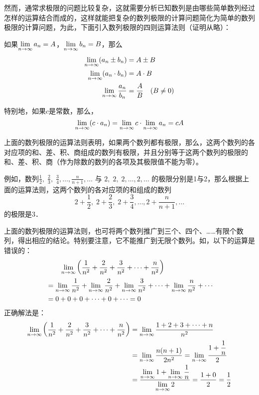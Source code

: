 然而，通常求极限的问题比较复杂，这就需要分析已知数列是由哪些简单数列经过怎样的运算结合而成的，这样就能把复杂的数列极限的计算问题简化为简单的数列极限的计算问题，为此，下面引入数列极限的四则运算法则（证明从略）：

\begin{thm}{}
如果$\lim\limits_{n\to \infty} a_n=A$，$\lim\limits_{n\to \infty} b_n=B$，那么
\[\begin{split}
    \lim\limits_{n\to \infty} (a_n\pm b_n)&=A\pm B\\
    \lim\limits_{n\to \infty} (a_n\cdot b_n)&=A\cdot B\\
    \lim\limits_{n\to \infty} \dfrac{a_n}{b_n}&=\dfrac{A}{B}\quad (B\ne 0)
\end{split}\]
\end{thm}

特别地，如果$c$是常数，那么，
\[\lim\limits_{n\to \infty}(c\cdot a_n)=\lim\limits_{n\to \infty} c\cdot \lim\limits_{n\to \infty}a_n=cA\]

上面的数列极限的运算法则表明，如果两个数列都有极限，那么，这两个数列的各对应项的和、差、积、商组成的数列有极限，并且分别等于这两个数列的极限的和、差、积、商（作为除数的数列的各项及其极限值不能为零）。

例如，数列$\frac{1}{2},\; \frac{2}{3},\; \frac{3}{4},\ldots, \frac{n}{n+1},\ldots$
与
$2,\;2,\;2,\ldots,2,\ldots$
的极限分别是1与2，那么根据上面的运算法则，这两个数列的各对应项的和组成的数列
$$2+\frac{1}{2},\; 2+\frac{2}{3},\; 2+\frac{3}{4},\ldots,2+\frac{n}{n+1},\ldots$$的极限是3．

上面的数列极限的运算法则，也可将两个数列推广到三个、四个、……有限个数列，得出相应的结论。特别要注意，它不能推广到无限个数列。如，以下的运算是错误的：
\[\begin{split}
   &\qquad  \lim\limits_{n\to \infty} \left(\dfrac{1}{n^2}+\dfrac{2}{n^2}+\dfrac{3}{n^2}+\cdots+\dfrac{n}{n^2}\right)\\
&=\lim\limits_{n\to \infty} \dfrac{1}{n^2}+\lim\limits_{n\to \infty} \dfrac{2}{n^2}+\lim\limits_{n\to \infty} \dfrac{3}{n^2}+\cdots+\lim\limits_{n\to \infty} \dfrac{n}{n^2}+\cdots\\
&= 0+0+0+\cdots+0+\cdots =0
\end{split}\]
正确解法是：
\[\begin{split}
    \lim\limits_{n\to \infty} \left(\dfrac{1}{n^2}+\dfrac{2}{n^2}+\dfrac{3}{n^2}+\cdots+\dfrac{n}{n^2}\right)&= \lim\limits_{n\to \infty} \dfrac{1+2+3+\cdots+n}{n^2}\\
    &= \lim\limits_{n\to \infty} \dfrac{n(n+1)}{2n^2}= \lim\limits_{n\to \infty} \dfrac{1+\dfrac{1}{n}}{2}\\
    &=\dfrac{ \lim\limits_{n\to \infty} 1+ \lim\limits_{n\to \infty} \dfrac{1}{n}}{ \lim\limits_{n\to \infty} 2}=\dfrac{1+0}{2}=\dfrac{1}{2}
\end{split}\]



